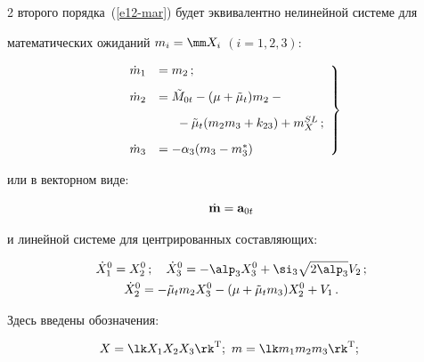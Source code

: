 \begin{multicols}{2}
второго порядка~(\ref{e12-mar}) будет эквивалентно нелинейной сис\-теме для


математических ожиданий $m_i = \mm X_i$ $(i=1,2,3)$:


\begin{equation}


\left.


\begin{array}{rl}


\dot m_1 &= m_2\,;\\[9pt]


\dot m_2 &= \tilde M_{0t} - (\mu +\tilde\mu_t) m_2 -{}\\[9pt]


&\hspace*{5mm}{}-\tilde\mu_t (m_2 m_3 + k_{23})+m_X^{SL}\,;\\[9pt]


\dot m_3 &=-\alpha_3 (m_3-m_3^*)


\end{array}


\right \}


\label{e15-mar}


\end{equation}


или в векторном виде:


    \begin{equation*}


    \dot {\bf m} = {\bf a}_{0t}




    \end{equation*}


и линейной сис\-теме для центрированных составляющих:


\begin{gather}


\dot X_1^0 = X_2^0\,;\quad \dot X_3^0 =-\alp_3 X_3^0 +\si_3 \sqrt{2\alp_3} V_2\,;\label{e17-mar}\\


\dot X_2^0 = -\tilde \mu_t m_2 X_3^0 -(\mu +\tilde\mu_t m_3)X_2^0 + V_1\,.


\label{e18-mar}


\end{gather}


Здесь введены обозначения:


        \begin{equation*}


    X=\lk X_1 X_2 X_3\rk^{\mathrm{T}};\ m= \lk m_1 m_2 m_3\rk^{\mathrm{T}};\ 



\end{equation*}
\end{multicols}
